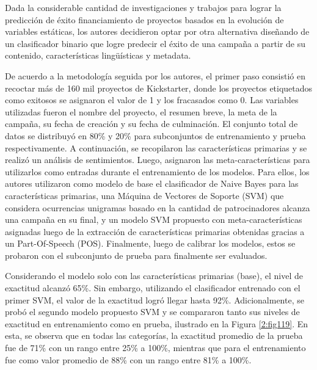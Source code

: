 Dada la considerable cantidad de investigaciones y trabajos para lograr la predicción de éxito financiamiento de proyectos basados en la evolución de variables estáticas, los autores decidieron optar por otra alternativa diseñando de un clasificador binario que logre predecir el éxito de una campaña a partir de su contenido, características lingüísticas y metadata.

De acuerdo a la metodología seguida por los autores, el primer paso consistió en recoctar más de 160 mil proyectos de Kickstarter, donde los proyectos etiquetados como exitosos se asignaron el valor de 1 y los fracasados como 0. Las variables utilizadas fueron el nombre del proyecto, el resumen breve, la meta de la campaña, su fecha de creación y su fecha de culminación. El conjunto total de datos se distribuyó en 80\% y 20\% para subconjuntos de entrenamiento y prueba respectivamente. A continuación, se recopilaron las características primarias y se realizó un análisis de sentimientos. Luego, asignaron las meta-características para utilizarlos como entradas durante el entrenamiento de los modelos. Para ellos, los autores utilizaron como modelo de base el clasificador de Naive Bayes para las características primarias, una Máquina de Vectores de Soporte (SVM) que considera ocurrencias unigramas basado en la cantidad de patrocinadores alcanza una campaña en su final, y un modelo SVM propuesto con meta-características asignadas luego de la extracción de características primarias obtenidas gracias a un Part-Of-Speech (POS). Finalmente, luego de calibrar los modelos, estos se probaron con el subconjunto de prueba para finalmente ser evaluados.

Considerando el modelo solo con las características primarias (base), el nivel de exactitud alcanzó 65\%. Sin embargo, utilizando el clasificador entrenado con el primer SVM, el valor de la exactitud logró llegar hasta 92\%. Adicionalmente, se probó el segundo modelo propuesto SVM y se compararon tanto sus niveles de exactitud en entrenamiento como en prueba, ilustrado en la Figura \ref{2:fig119}. En esta, se observa que en todas las categorías, la exactitud promedio de la prueba fue de 71\% con un rango entre 25\% a 100\%, mientras que para el entrenamiento fue como valor promedio de 88\% con un rango entre 81\% a 100\%.


